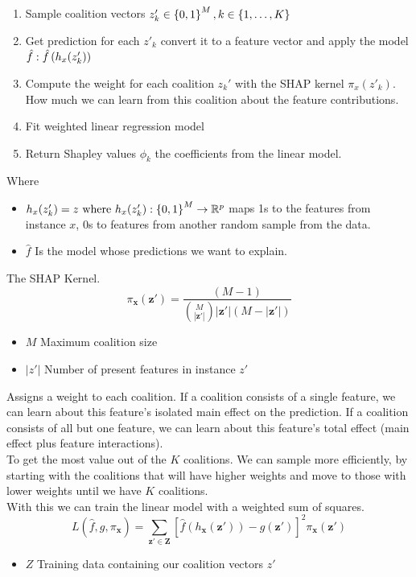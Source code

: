 \begin{enumerate}
	\item Sample coalition vectors $z'_k \in \left \{0,1\right\}^M, k \in \left \{1, \dots , K\right\}$
	\item Get prediction for each $z'_k$ convert it to a feature vector and apply the model $\hat f: \hat f \left (h_x(z_k')\right)$
	\item Compute the weight for each coalition $z_k'$ with the SHAP kernel $\pi_x(z'_k)$. How much we can learn from this coalition about the feature contributions.
	\item Fit weighted linear regression model
	\item Return Shapley values $\phi_k$ the coefficients from the linear model.
\end{enumerate}
Where
\begin{itemize}
	\item $h_x(z_k')=z \text{ where } h_x(z_k'):\left \{0,1\right\}^M \to \mathbb{R}^p$ maps 1s to the features from instance $x$, 0s to features from another random sample from the data.
	\item $\hat f$ Is the model whose predictions we want to explain.
\end{itemize}
The SHAP Kernel.
\begin{equation}
	\pi_{\mathbf{x}}(\mathbf{z}') = \frac{(M-1)}{\binom{M}{|\mathbf{z}'|} |\mathbf{z}'| (M - |\mathbf{z}'|)}
	\label{eq:shap-kernel}
\end{equation}
\begin{itemize}
	\item $M$ Maximum coalition size
	\item $|z'|$ Number of present features in instance $z'$
\end{itemize}
Assigns a weight to each coalition. If a coalition consists of a single feature, we can learn about this feature’s isolated main effect on the prediction.
If a coalition consists of all but one feature, we can learn about this feature’s total effect (main effect plus feature interactions).\\

To get the most value out of the $K$ coalitions. We can sample more efficiently, by starting with the coalitions that will have higher weights and move to those with lower weights until we have $K$ coalitions.\\

With this we can train the linear model with a weighted sum of squares.
\begin{equation}
	L(\hat{f}, g, \pi_{\mathbf{x}}) = \sum_{\mathbf{z}' \in \mathbf{Z}} [\hat{f}(h_{\mathbf{x}}(\mathbf{z}')) - g(\mathbf{z}')]^2 \pi_{\mathbf{x}}(\mathbf{z}')
	\label{eq:linear-model-shap-kernel}
\end{equation}
\begin{itemize}
	\item $Z$ Training data containing our coalition vectors $z'$
\end{itemize}

